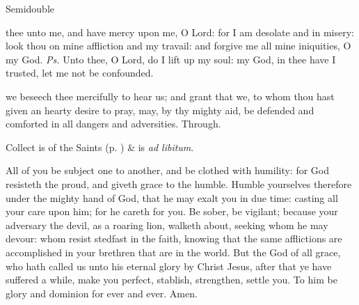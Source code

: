 \label{TrinityIII}
\begin{inhead}
    {Semidouble}
\end{inhead}

\properantiphonfix

\introit
{} thee unto me, and have mercy upon me, O Lord: for I am desolate and in misery: look thou on mine affliction and my travail: and forgive me all mine iniquities, O my God. \textit{Ps.} Unto thee, O Lord, do I lift up my soul: my God, in thee have I trusted, let me not be confounded.

\collect\label{TrinityIIICollect}
 we beseech thee mercifully to hear us; and grant that we, to whom thou hast given an hearty desire to pray, may, by thy mighty aid, be defended and comforted in all dangers and adversities. Through.
\begin{rubric}
     Collect is of the Saints (p. \pageref{SPSaints}) \&  is \emph{ad libitum}.
\end{rubric}

 All of you be subject one to another, and be clothed with humility: for God resisteth the proud, and giveth grace to the humble. Humble yourselves therefore under the mighty hand of God, that he may exalt you in due time: casting all your care upon him; for he careth for you. Be sober, be vigilant; because your adversary the devil, as a roaring lion, walketh about, seeking whom he may devour: whom resist stedfast in the faith, knowing that the same afflictions are accomplished in your brethren that are in the world. But the God of all grace, who hath called us unto his eternal glory by Christ Jesus, after that ye have suffered a while, make you perfect, stablish, strengthen, settle you. To him be glory and dominion for ever and ever. Amen.


